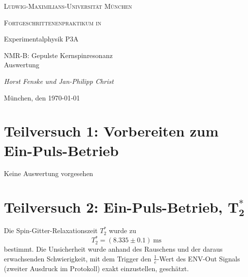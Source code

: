 \documentclass[11pt,a4paper,oneside]{scrartcl}
\author{Jan-Philipp Christ (Mat.-Nr. 12231979) \\\\\textsc{LMU München}}
\begin{document}


%
\begin{titlepage}
	\centering
	{\scshape\LARGE Ludwig-Maximilians-Universität \linebreak München \par}
	\vspace{1cm}
	{\scshape\Large Fortgeschrittenenpraktikum in \par Experimentalphysik \linebreak P3A\par}
	\vspace{1.5cm}
	{\huge\bfseries \par  NMR-B: Gepulste Kernspinresonanz\\Auswertung\par}
	\vspace{2cm}
	{\Large\itshape Horst Fenske und Jan-Philipp Christ \par}
	\vfill
	{\large München, den \today\par}
\end{titlepage}

\tableofcontents
\newpage
\section{Teilversuch 1: Vorbereiten zum Ein-Puls-Betrieb}
Keine Auswertung vorgesehen
\section{Teilversuch 2: Ein-Puls-Betrieb, $\mathbf{T_2^*}$}
Die Spin-Gitter-Relaxationszeit $T_2^*$ wurde zu 
$$
T_2^*=(8.335\pm 0.1)\ \mathrm{ms}
$$
bestimmt. Die Unsicherheit wurde anhand des Rauschens und der daraus erwachsenden Schwierigkeit, mit dem Trigger den $\frac{1}{e}$-Wert des ENV-Out Signals (zweiter Ausdruck im Protokoll) exakt einzustellen, geschätzt.
\end{document}
